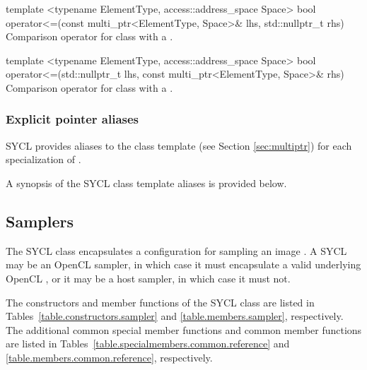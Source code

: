 \addRowTwoL
{template <typename ElementType, access::address_space Space>}
{bool operator<=(const multi_ptr<ElementType, Space>\& lhs, std::nullptr_t rhs)}
{Comparison operator \codeinline{<=} for  class with a
.}

\addRowTwoL
{template <typename ElementType, access::address_space Space>}
{bool operator<=(std::nullptr_t lhs, const multi_ptr<ElementType, Space>\& rhs)}
{Comparison operator \codeinline{<=} for  class with a
.}

\completeTable
\subsubsection{Explicit pointer aliases}
\label{sec:pointerclasses}

SYCL provides aliases to the  class template (see Section
\ref{sec:multiptr}) for each specialization of .

A synopsis of the SYCL  class template 
aliases is provided below.



\subsection{Samplers}
\label{subsec:samplers}

The SYCL  class encapsulates a configuration for sampling an image . A SYCL  may be an OpenCL sampler, in which case it must encapsulate a valid underlying OpenCL , or it may be a host sampler, in which case it must not.

The constructors and member functions of the SYCL  class are listed in Tables~\ref{table.constructors.sampler} and \ref{table.members.sampler}, respectively. The additional common special member functions and common member functions are listed in Tables~\ref{table.specialmembers.common.reference} and \ref{table.members.common.reference}, respectively.

